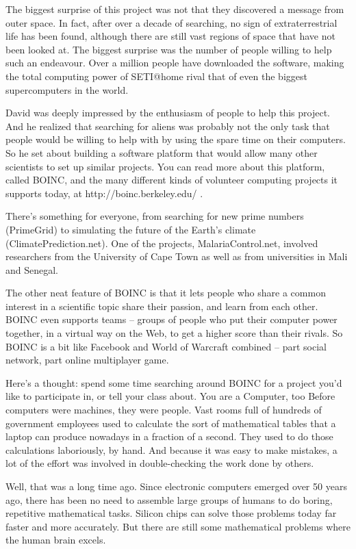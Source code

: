 The biggest surprise of this project was not that they discovered a message from outer space. In fact, after over a decade of searching, no sign of extraterrestrial life has been found, although there are still vast regions of space that have not been looked at. The biggest surprise was the number of people willing to help such an endeavour. Over a million people have downloaded the software, making the total computing power of SETI@home rival that of even the biggest supercomputers in the world.

David was deeply impressed by the enthusiasm of people to help this project. And he realized that searching for aliens was probably not the only task that people would be willing to help with by using the spare time on their computers. So he set about building a software platform that would allow many other scientists to set up similar projects. You can read more about this platform, called BOINC, and the many different kinds of volunteer computing projects it supports today, at http://boinc.berkeley.edu/ . 

There’s something for everyone, from searching for new prime numbers (PrimeGrid) to simulating the future of the Earth’s climate (ClimatePrediction.net). One of the projects, MalariaControl.net, involved researchers from the University of Cape Town as well as from universities in Mali and Senegal. 

The other neat feature of BOINC is that it lets people who share a common interest in a scientific topic share their passion, and learn from each other. BOINC even supports teams – groups of people who put their computer power together, in a virtual way on the Web, to get a higher score than their rivals. So BOINC is a bit like Facebook and World of Warcraft combined – part social network, part online multiplayer game.

Here’s a thought: spend some time searching around BOINC for a project you’d like to participate in, or tell your class about. 
You are a Computer, too
Before computers were machines, they were people. Vast rooms full of hundreds of government employees used to calculate the sort of mathematical tables that a laptop can produce nowadays in a fraction of a second. They used to do those calculations laboriously, by hand. And because it was easy to make mistakes, a lot of the effort was involved in double-checking the work done by others. 

Well, that was a long time ago. Since electronic computers emerged over 50 years ago, there has been no need to assemble large groups of humans to do boring, repetitive mathematical tasks. Silicon chips can solve those problems today far faster and more accurately. But there are still some mathematical problems where the human brain excels.


